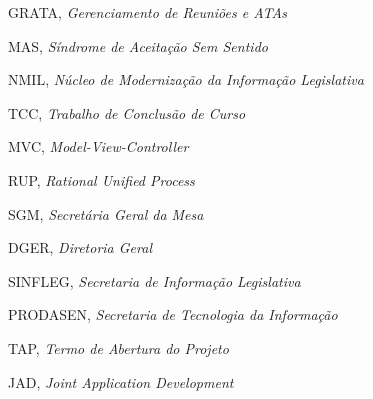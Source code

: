 \begin{siglas}
	\item GRATA, \textit{Gerenciamento de Reuniões e ATAs}
  	\item MAS, \textit{Síndrome de Aceitação Sem Sentido}
  	\item NMIL, \textit{Núcleo de Modernização da Informação Legislativa}
  	\item TCC, \textit{Trabalho de Conclusão de Curso}
  	\item MVC, \textit{Model-View-Controller}
  	\item RUP, \textit{Rational Unified Process}
  	\item SGM, \textit{Secretária Geral da Mesa}
  	\item DGER, \textit{Diretoria Geral}
  	\item SINFLEG, \textit{Secretaria de Informação Legislativa}
  	\item PRODASEN, \textit{Secretaria de Tecnologia da Informação}
  	\item TAP, \textit{Termo de Abertura do Projeto}
  	\item JAD, \textit{Joint Application Development}
\end{siglas}